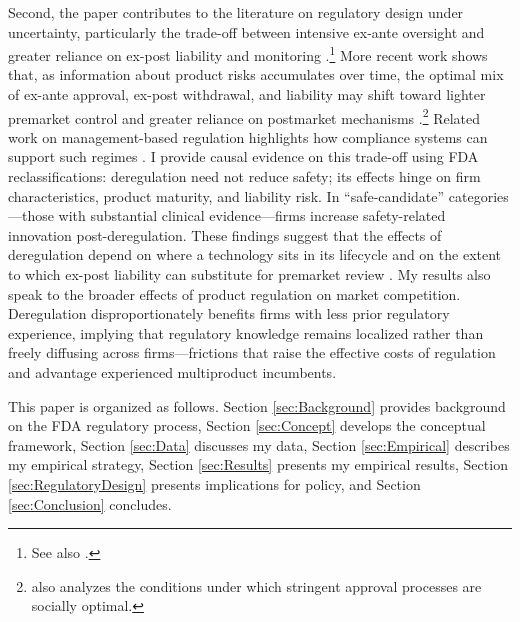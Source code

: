 \documentclass[letterpaper,12pt]{article}
\theoremstyle{definition}
\begin{document}
Second, the paper contributes to the literature on regulatory design under uncertainty, particularly the trade-off between intensive ex-ante oversight and greater reliance on ex-post liability and monitoring \citep{Shavell:1984,shavell1986judgment,Kolstad:1990}.\footnote{See also \citet{ehrlich1974economic, glaeser2001coase, kessler2010regulation, shavell2018liability}.} More recent work shows that, as information about product risks accumulates over time, the optimal mix of ex-ante approval, ex-post withdrawal, and liability may shift toward lighter premarket control and greater reliance on postmarket mechanisms \citep{henry2022regulation,philipson2010effects}.\footnote{\citet{Henry:2019} also analyzes the conditions under which stringent approval processes are socially optimal.} Related work on management-based regulation highlights how compliance systems can support such regimes \citep{coglianese2003management}. I provide causal evidence on this trade-off using FDA reclassifications: deregulation need not reduce safety; its effects hinge on firm characteristics, product maturity, and liability risk. In “safe-candidate” categories---those with substantial clinical evidence---firms increase safety-related innovation post-deregulation. These findings suggest that the effects of deregulation depend on where a technology sits in its lifecycle and on the extent to which ex-post liability can substitute for premarket review \citep{galasso2017tort}. My results also speak to the broader effects of product regulation on market competition.\footnotemark {} Deregulation disproportionately benefits firms with less prior regulatory experience, implying that regulatory knowledge remains localized rather than freely diffusing across firms---frictions that raise the effective costs of regulation and advantage experienced multiproduct incumbents.




This paper is organized as follows. Section \ref{sec:Background} provides background on the FDA regulatory process, Section \ref{sec:Concept} develops the conceptual framework, Section \ref{sec:Data} discusses my data, Section \ref{sec:Empirical} describes my empirical strategy, Section \ref{sec:Results} presents my empirical results, Section \ref{sec:RegulatoryDesign} presents implications for policy, and Section \ref{sec:Conclusion} concludes. 
\end{document}
